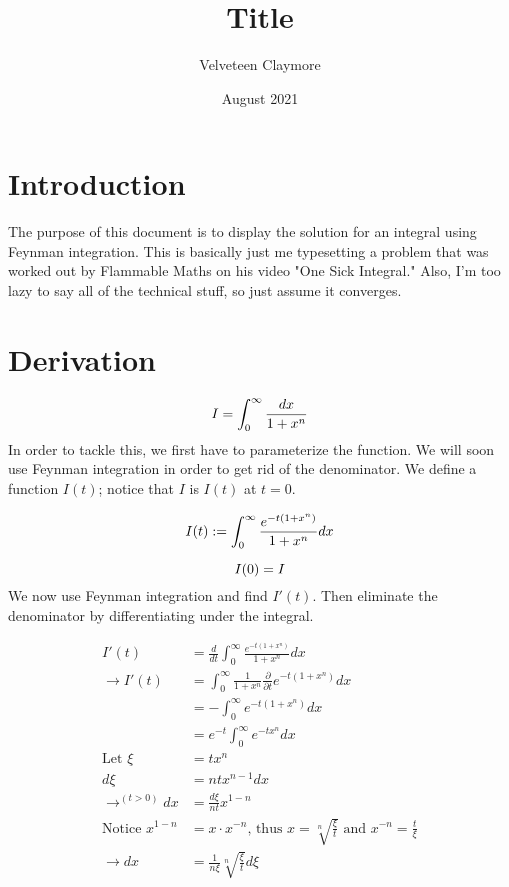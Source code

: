 \documentclass[12pt]{article}
\title{Title}
\author{Velveteen Claymore}
\date{August 2021}
\begin{document}
\maketitle

\section{Introduction}
The purpose of this document is to display the solution for an integral using Feynman integration. This is basically just me typesetting a problem that was worked out by Flammable Maths on his video "One Sick Integral." Also, I'm too lazy to say all of the technical stuff, so just assume it converges. \\[2\baselineskip] %
\section{Derivation}
\begin{equation}
    I = \int_{0}^{\infty}\frac{dx}{1+x^n} \\
\end{equation}
In order to tackle this, we first have to parameterize the function. We will soon use Feynman integration in order to get rid of the denominator. We define a function \(I(t) \); notice that \(I\) is \(I(t)\) at \(t = 0\).

\begin{equation}
  I(t) := \int_{0}^{\infty}\frac{e^{-t(1+x^n)}}{1+x^n}dx \\  
\end{equation}

\begin{equation}
    I(0) = I \nonumber\\ 
\end{equation}
We now use Feynman integration and find \(I'(t)\). Then eliminate the denominator  by differentiating under the integral.

\begin{equation*}
\begin{split}
    I'(t) & = \frac{d}{dt} \int_{0}^{\infty} \frac{e^{-t(1+x^n)}}{1+x^n}dx \\
    \to I'(t) & = \int_{0}^{\infty} \frac{1}{1+x^n} \frac{\partial}{\partial t} e^{-t(1+x^n)}dx \\
    & = - \int_{0}^{\infty} e^{-t(1+x^n)}dx \\
    & = e^{-t} \int_{0}^{\infty} e^{-tx^n}dx \\
    \text{Let } \xi & = tx^n \\
    d\xi & = ntx^{n-1} dx \\
    \to^{(t>0)} dx & = \frac{d\xi}{nt} x^{1-n} \\
    \text{Notice }x^{1-n} & = x\cdot x^{-n} \text{, thus } x= \sqrt[n]{\frac{\xi}{t}} \text{ and } x^{-n} = \frac{t}{\xi} \\
    \to dx & = \frac{1}{n\xi} \sqrt[n]{\frac{\xi}{t}} d\xi \\
\end{split}
\end{equation*}
\end{document}
